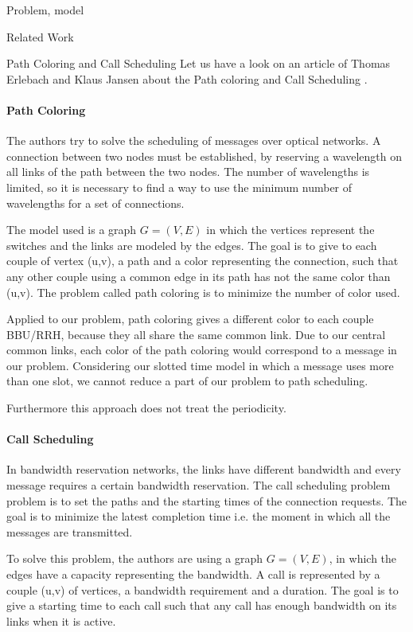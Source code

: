 \documentclass[a4paper,10pt]{report}
\begin{document}
\begin{chapter}{Problem, model}
\begin{section}{Related Work}
\begin{enumerate}
\end{enumerate}

\begin{subsection}{Path Coloring and Call Scheduling}
Let us have a look on an article of Thomas Erlebach and Klaus Jansen about the Path coloring and Call Scheduling \cite{erlebach2001complexity}.

\paragraph{Path Coloring}
The authors try to solve the scheduling of messages over optical networks. A connection between two nodes must be established, by reserving a wavelength on all links of the
path between the two nodes. The number of wavelengths is limited, so it is necessary to find a way to use the minimum number of wavelengths for a set 
of connections.

The model used is a graph $G=(V,E)$ in which the vertices represent the switches and the links are modeled by the edges. The goal is to give to each
couple of vertex (u,v), a path and a color representing the connection, such that any other couple using a common edge in its path has not the same
color than (u,v). The problem called path coloring is to minimize the number of color used.

Applied to our problem, path coloring gives a different color to each couple BBU/RRH, because they all share the same common link.
Due to our central common links, each color of the path coloring
would correspond to a message in our problem. Considering our slotted time model in which a message uses more than one slot,
we cannot reduce a part of our problem to path scheduling.

Furthermore this approach does not treat the periodicity. 

\paragraph{Call Scheduling}
In bandwidth reservation networks, the links have different bandwidth and every message 
requires a certain bandwidth reservation. The call scheduling problem problem is to set the paths and the starting times of the connection requests.
The goal is to minimize the latest completion time i.e. the moment in which all the messages are transmitted.

To solve this problem, the authors are using a graph $G=(V,E)$, in which the edges have a capacity representing the bandwidth.
A call is represented by a couple (u,v) of vertices, a bandwidth requirement and a duration. The goal is to give a starting time to each call
such that any call has enough bandwidth on its links when it is active.


\end{subsection}
\end{section}
\end{chapter}
\end{document}
